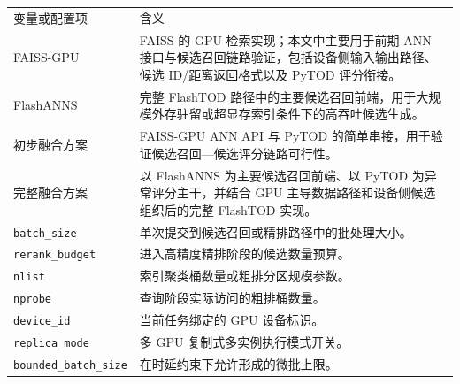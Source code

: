 \renewcommand{\arraystretch}{1.2}
\small
\noindent
\begin{tabularx}{\textwidth}{P{0.34\textwidth}Y}
变量或配置项 & 含义 \\
FAISS-GPU & FAISS 的 GPU 检索实现；本文中主要用于前期 ANN 接口与候选召回链路验证，包括设备侧输入输出路径、候选 ID/距离返回格式以及 PyTOD 评分衔接。 \\
FlashANNS & 完整 FlashTOD 路径中的主要候选召回前端，用于大规模外存驻留或超显存索引条件下的高吞吐候选生成。 \\
初步融合方案 & FAISS-GPU ANN API 与 PyTOD 的简单串接，用于验证候选召回---候选评分链路可行性。 \\
完整融合方案 & 以 FlashANNS 为主要候选召回前端、以 PyTOD 为异常评分主干，并结合 GPU 主导数据路径和设备侧候选组织后的完整 FlashTOD 实现。 \\
\texttt{batch\_size} & 单次提交到候选召回或精排路径中的批处理大小。 \\
\texttt{rerank\_budget} & 进入高精度精排阶段的候选数量预算。 \\
\texttt{nlist} & 索引聚类桶数量或粗排分区规模参数。 \\
\texttt{nprobe} & 查询阶段实际访问的粗排桶数量。 \\
\texttt{device\_id} & 当前任务绑定的 GPU 设备标识。 \\
\texttt{replica\_mode} & 多 GPU 复制式多实例执行模式开关。 \\
\texttt{bounded\_batch\_size} & 在时延约束下允许形成的微批上限。 \\
\end{tabularx}
